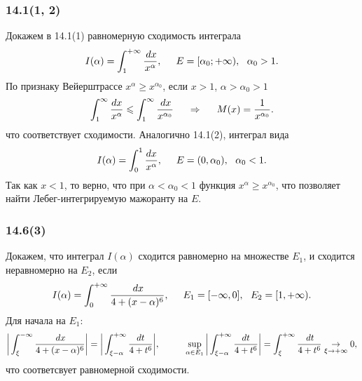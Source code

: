 \subsubsection*{14.1(1, 2)}
Докажем в 14.1(1) равномерную сходимость интеграла
\begin{equation*}
    I(\alpha) = \int_1^{+\infty} \frac{\, d x}{x^\alpha}, \hspace{5 mm} 
    E = [\alpha_0; + \infty), \ \ \alpha_0 > 1.
\end{equation*}
По признаку Вейерштрассе $x^\alpha \geq x^{\alpha_0}$, если $x > 1$, $\alpha > \alpha_0 > 1$
\begin{equation*}
    \int_1^{\infty} \frac{dx}{x^\alpha} \leqslant \int_1^{\infty} \frac{\, d x}{x^{\alpha_0}}
    \hspace{0.5cm} \Rightarrow \hspace{0.5cm}
    M(x) = \frac{1}{x^{\alpha_0}}.
\end{equation*}
что соответствует сходимости. Аналогично 14.1(2), интеграл вида
\begin{equation*}
    I(\alpha) = \int_0^1 \frac{d x}{x^\alpha}, \hspace{5 mm} E = (0, \alpha_0), \ \ \alpha_0 < 1.
\end{equation*}
Так как $x < 1$, то верно, что при $\alpha < \alpha_0 < 1$ функция $x^{\alpha} \geq x^{\alpha_0}$, что позволяет найти Лебег-интегрируемую мажоранту на $E$. 




\subsubsection*{14.6(3)}

Докажем, что интеграл $I(\alpha)$ сходится равномерно на множестве $E_1$, и сходится неравномерно на $E_2$, если 
\begin{equation*}
    I(\alpha) = \int_{0}^{+\infty} \frac{\, d x}{4 + (x-\alpha)^6}, \hspace{5 mm} E_1 = [-\infty, 0], \ \ E_2 = [1, + \infty).
\end{equation*}
Для начала на $E_1$:
\begin{equation*}
    \bigg|
        \int_{\xi}^{-\infty} \frac{\d x}{4 + (x-\alpha)^6}
    \bigg|  = \bigg|
        \int_{\xi-\alpha}^{+\infty} \frac{d t}{ 4 + t^6} 
    \bigg|,
    \hspace{10 mm}
    \sup_{\alpha \in E_1} \bigg|
        \int_{\xi-\alpha}^{+\infty} \frac{d t}{4 + t^6} 
    \bigg| = \int_\xi^{+\infty} \frac{\d t }{4 + t^6} 
    \underset{\xi \to + \infty}{\to} 0,
\end{equation*}
что соответсвует равномерной сходимости. 

